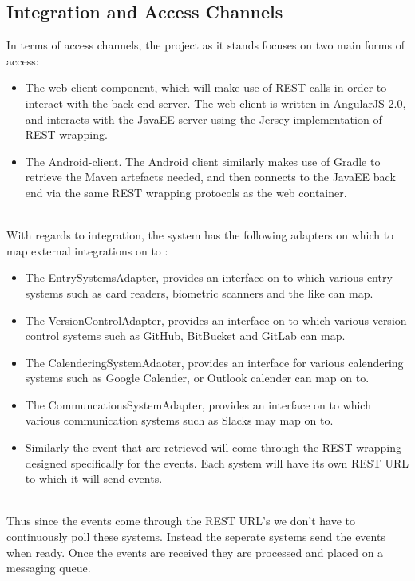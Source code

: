 \documentclass[11pt,a4paper]{article}
\begin{document}
\subsection{Integration and Access Channels}
In terms of access channels, the project as it stands focuses on two main forms of access:
\begin{itemize}
	\item The web-client component, which will make use of REST calls in order to interact with the back end server. The web client is written in AngularJS 2.0, and interacts with the JavaEE server using the Jersey implementation of REST wrapping.
	\item The Android-client. The Android client similarly makes use of Gradle to retrieve the Maven artefacts needed, and then connects to the JavaEE back end via the same REST wrapping protocols as the web container.\\\\
\end{itemize}
With regards to integration, the system has the following adapters on which to map external integrations on to :
\begin{itemize}
	\item The EntrySystemsAdapter, provides an interface on to which various entry systems such as card readers, biometric scanners and the like can map.
	\item The VersionControlAdapter, provides an interface on to which various version control systems such as GitHub, BitBucket and GitLab can map.
	\item The CalenderingSystemAdaoter, provides an interface for various calendering systems such as Google Calender, or Outlook calender can map on to.
	\item The CommuncationsSystemAdapter, provides an interface on to which various communication systems such as Slacks may map on to.
	
	\item Similarly the event that are retrieved will come through the REST wrapping designed specifically for the events. Each system will
	have its own REST URL to which it will send events. \\\\
\end{itemize}

Thus since the events come through the REST URL's we don't have to continuously poll these systems. Instead the seperate systems send the events when ready. Once the events are received they are processed and placed on a messaging queue.
\end{document}
